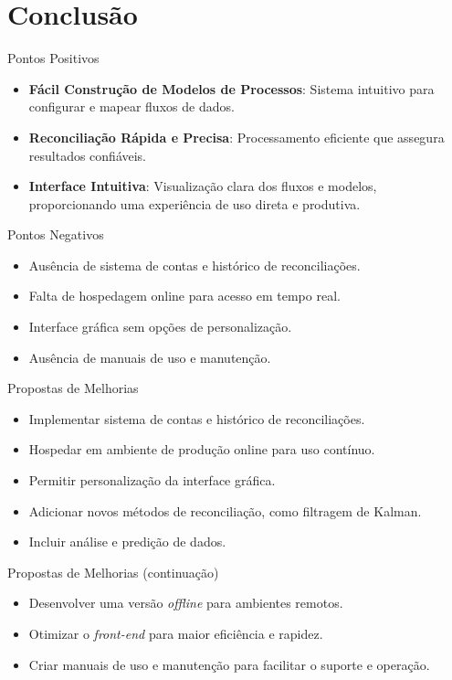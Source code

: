 \section{Conclusão}

\begin{frame}{Pontos Positivos}
    \begin{itemize}
        \item \textbf{Fácil Construção de Modelos de Processos}: Sistema intuitivo para configurar e mapear fluxos de dados.
        \item \textbf{Reconciliação Rápida e Precisa}: Processamento eficiente que assegura resultados confiáveis.
        \item \textbf{Interface Intuitiva}: Visualização clara dos fluxos e modelos, proporcionando uma experiência de uso direta e produtiva.
    \end{itemize}
\end{frame}

\begin{frame}{Pontos Negativos}
    \begin{itemize}
        \item Ausência de sistema de contas e histórico de reconciliações.
        \item Falta de hospedagem online para acesso em tempo real.
        \item Interface gráfica sem opções de personalização.
        \item Ausência de manuais de uso e manutenção.
    \end{itemize}
\end{frame}

\begin{frame}{Propostas de Melhorias}
    \begin{itemize}
        \item Implementar sistema de contas e histórico de reconciliações.
        \item Hospedar em ambiente de produção online para uso contínuo.
        \item Permitir personalização da interface gráfica.
        \item Adicionar novos métodos de reconciliação, como filtragem de Kalman.
        \item Incluir análise e predição de dados.
    \end{itemize}
\end{frame}

\begin{frame}{Propostas de Melhorias (continuação)}
    \begin{itemize}
        \item Desenvolver uma versão \textit{offline} para ambientes remotos.
        \item Otimizar o \textit{front-end} para maior eficiência e rapidez.
        \item Criar manuais de uso e manutenção para facilitar o suporte e operação.
    \end{itemize}
\end{frame}

